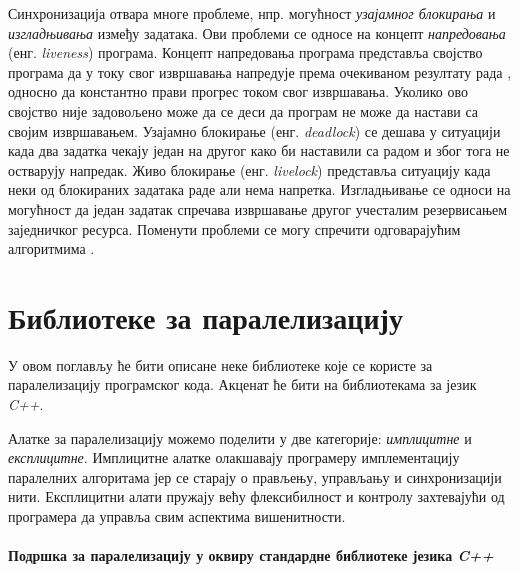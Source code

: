 \documentclass[12pt,oneside]{memoir}
\begin{document}
 Синхронизација отвара многе проблеме, нпр. могућност \textit{узајамног блокирања} и \textit{изгладњивања} између задатака. Ови проблеми се односе на концепт \textit{напредовања} (енг. \textit{liveness}) програма. Концепт напредовања програма представља својство програма да у току свог извршавања напредује према очекиваном резултату рада , односно да константно прави прогрес током свог извршавања. Уколико ово својство није задовољено може да се деси да програм не може да настави са својим извршавањем. Узајамно блокирање (енг. \textit{deadlock}) се дешава у ситуацији када два задатка чекају један на другог како би наставили са радом и због тога не остварују напредак. Живо блокирање (енг. \textit{livelock}) представља ситуацију када неки од блокираних задатака раде али нема напретка. Изгладњивање се односи на могућност да један задатак спречава извршавање другог учесталим резервисањем заједничког ресурса. Поменути проблеми се могу спречити одговарајућим алгоритмима \cite{opsis}.


  \section{Библиотеке за паралелизацију}
	У овом поглављу ће бити описане неке библиотеке које се користе за паралелизацију програмског кода. Акценат ће бити на библиотекама за језик \textit{C++}. 
	
 Алатке за паралелизацију можемо поделити у две категорије: \textit{имплицитне} и \textit{експлицитне}. Имплицитне алатке олакшавају програмеру имплементацију паралелних алгоритама јер се старају о прављењу, управљању и синхронизацији нити. Експлицитни алати пружају већу флексибилност и контролу захтевајући од програмера да управља свим аспектима вишенитности.
\paragraph{Подршка за паралелизацију у оквиру стандардне библиотеке језика \textit{C++}}
\end{document}
